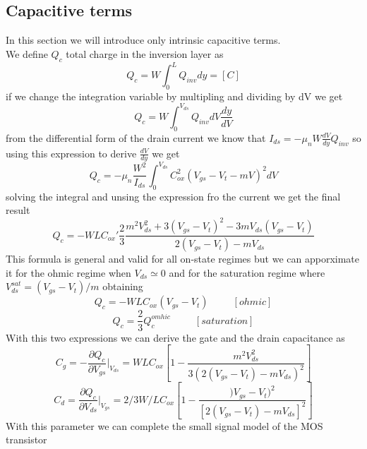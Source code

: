 \subsection{Capacitive terms}
In this section we will introduce only intrinsic capacitive terms.\\
We define $Q_c$ total charge in the inversion layer as 
\begin{equation}
Q_c=W\int^L_0Q_{inv}dy=[C]
\end{equation}
if we change the integration variable by multipling and dividing by dV we get
\begin{equation}
Q_c=W\int^{V_{ds}}_0Q_{inv}dV\frac{dy}{dV}
\end{equation}
from the differential form of the drain current we know that $I_{ds}=-\mu_nW \frac{dV}{dy}Q_{inv}$ so using this expression to derive $\frac{dV}{dy}$ we get
\begin{equation}
Q_c=-\mu_n \frac{W^2}{I_{ds}}\int^{V_{ds}}_0 C_{ox}^2(V_{gs}-V_t-mV)^2dV
\end{equation}
solving the integral and unsing the expression fro the current we get the final result
\begin{equation}
Q_c=-WLC_{ox}'\frac{2}{3} \frac{m^2V_{ds}^2 + 3(V_{gs}-V_t)^2 -3mV_{ds}(V_{gs}-V_t)}{2(V_{gs}-V_t)-mV_{ds}}
\end{equation}
This formula is general and valid for all on-state regimes but we can apporximate it for the ohmic regime when $V_{ds}\simeq 0$ and for the saturation regime where $V_{ds}^{sat}=(V_{gs}-V_t)/m$ obtaining
\begin{equation}
Q_c=-WLC_{ox}(V_{gs}-V_t)   \ \ \ \ \ \ \ \ \ \ \ [ohmic]
\end{equation}
\begin{equation}
Q_c=\frac{2}{3}  Q_c^{omhic} \ \ \ \ \ \ \ \ \ \ \ [saturation]
\end{equation}
With this two expressions we can derive the gate and the drain capacitance as
\begin{equation}
C_g=-\frac{\partial Q_c}{\partial V_{gs}}|_{V_{ds}}=WLC_{ox}[1-\frac{m^2V_{ds}^2}{3(2(V_{gs}-V_t)-mV_{ds})^2}]
\end{equation}
\begin{equation}
C_d=\frac{\partial Q_c}{\partial V_{ds}}|_{V_{gs}}=2/3W/LC_{ox}[1-\frac{)V_{gs}-V_{t})^2}{[2(V_{gs}-V_t)-mV_{ds}]^2}]
\end{equation}
With this parameter we can complete the small signal model of the MOS transistor\\

